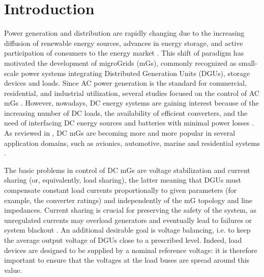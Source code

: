 \documentclass[a4paper]{article}
\theoremstyle{plain}
\begin{document}
\section{Introduction}
\label{sec:intro}
Power generation and distribution are rapidly changing due to the
increasing diffusion of renewable energy sources, advances in energy
storage, and active participation of consumers to the energy market
\cite{ipakchi2009grid, hu2016greener,justo2013ac}. This shift of paradigm has motivated the
development of migroGrids (mGs), commonly recognized as small-scale
power systems integrating Distributed Generation Units (DGUs), storage
devices and loads. 
Since AC power generation is the standard for commercial, residential,
and industrial utilization, several studies focused on the control of AC mGs
\cite{guerrero2013advanced,riverso2014plug,bolognani2013distributed, 7097655, 7500071}. However,
nowadays, DC energy systems are gaining interest
\cite{dragicevic2015dc,elsayed2015dc} because of the
increasing number of DC loads, the availability of efficient
converters, and the need of interfacing DC energy sources and
batteries with minimal power losses \cite{justo2013ac,elsayed2015dc, fairley2012dc}. As reviewed in \cite{elsayed2015dc}, DC mGs are
becoming more and more popular in several application domains, such as
avionics, automotive, marine and residential systems \cite{elsayed2015dc}. 

The basic
problems in control of DC mGs are  voltage stabilization
\cite{dragicevic2015dc,tucci2015decentralized,zhao2015distributed,de2016power,cezar2015stability,hamzeh2016power, zonetti2014globally} and
current sharing (or, equivalently, load sharing), the latter meaning
that DGUs must compensate constant load currents proportionally to given parameters (for example, the converter ratings) and independently of the mG topology and line
impedances. Current sharing is crucial for preserving the safety
of the system, as unregulated currents may overload generators and eventually lead to failures or system
blackout \cite{han2016review}. An
additional desirable goal is voltage balancing, i.e. to keep the average output
voltage of DGUs close to a prescribed level. 
Indeed, load devices are designed to be supplied by a nominal
reference voltage: it is therefore
important to ensure that the voltages at the load buses are spread around this value.
\end{document}
